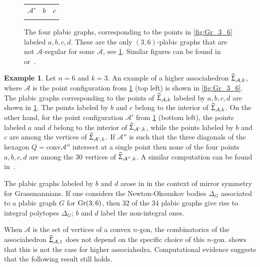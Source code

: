 \documentclass[11pt]{amsart}
\theoremstyle{plain}
\theoremstyle{definition}
\newtheorem{example}[theorem]{Example}
\def\A{\mathcal{A}}
\def\Acal{\mathcal{A}}
\def\conv{\mathrm{conv}}
\def\HSP{\widehat\Upsigma}
\def\Sigma{\HSP}
\begin{document}
\begin{figure}
\begin{tabular}{c|c|c}
$\Acal'$
&
$b$
&
$c$
\\

 && \\

\end{tabular}

\caption{\label{fig:hexagons} The four plabic graphs, corresponding to the points in \cref{fig:Gr_3_6} labeled $a,b,c,d$. These are the only $(3,6)$-plabic graphs that are not $\A$-regular for some $\A$, see \cref{ex:hexagons}. Similar figures can be found in~\cite[Figure~18]{KK} or~\cite[Figure~1]{OS}.} 
\end{figure}


\begin{example} \label{ex:hexagons}
Let $n=6$ and $k=3$. An example of a higher associahedron $\Sigma_{\A,k}$, where $\A$ is the point configuration from \cref{fig:hexagons} (top left) is shown in \cref{fig:Gr_3_6}. The plabic graphs corresponding to the points of $\Sigma_{\A,k}$ labeled by $a,b,c,d$ are shown in \cref{fig:hexagons}. The points labeled by $b$ and $c$ belong to the interior of $\Sigma_{\A,k}$. On the other hand, for the point configuration $\A'$ from \cref{fig:hexagons} (bottom left), the points labeled $a$ and $d$ belong to the interior of $\Sigma_{\A',k}$, while the points labeled by $b$ and $c$ are among the vertices of $\Sigma_{\A',k}$. If $\A''$ is such that the three diagonals of the hexagon $Q=\conv\A''$ intersect at a single point then none of the four points $a,b,c,d$ are among the $30$ vertices of $\Sigma_{\A'',k}$. A similar computation can be found in~\cite[Theorem~4.2]{KK}.

The plabic graphs labeled by $b$ and $d$ arose in \cite[Section 8]{RW} in 
the context of mirror symmetry for Grassmannians.  If one considers
the Newton-Okounkov bodies $\Delta_G$ associated to a plabic
graph $G$ for $\operatorname{Gr}(3,6)$, then $32$ of the $34$ plabic graphs
give rise to integral polytopes $\Delta_G$;
$b$ and $d$ label the non-integral ones.
\end{example}


When $\A$ is the set of vertices of a convex $n$-gon, the combinatorics of the associahedron $\Sigma_{\A,1}$ does not depend on the specific choice of this $n$-gon.  shows that this is not the case for higher associahedra. Computational evidence suggests that the following result still holds. 
\end{document}
